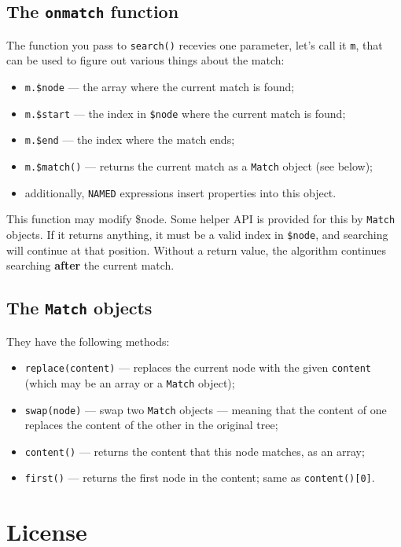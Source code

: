 \documentclass[a4paper,10pt]{article}
\begin{document}
\subsection{The \texttt{onmatch} function}
\label{sec-4-1}


The function you pass to \texttt{search()} recevies one parameter, let's call it
\texttt{m}, that can be used to figure out various things about the match:

\begin{itemize}
\item \texttt{m.\$node} — the array where the current match is found;
\item \texttt{m.\$start} — the index in \texttt{\$node} where the current match is found;
\item \texttt{m.\$end} — the index where the match ends;
\item \texttt{m.\$match()} — returns the current match as a \texttt{Match} object (see below);
\item additionally, \texttt{NAMED} expressions insert properties into this object.
\end{itemize}

This function may modify \$node.  Some helper API is provided for this by
\texttt{Match} objects.  If it returns anything, it must be a valid index in
\texttt{\$node}, and searching will continue at that position.  Without a return
value, the algorithm continues searching \textbf{after} the current match.
\subsection{The \texttt{Match} objects}
\label{sec-4-2}


They have the following methods:

\begin{itemize}
\item \texttt{replace(content)} — replaces the current node with the given \texttt{content}
  (which may be an array or a \texttt{Match} object);
\item \texttt{swap(node)} — swap two \texttt{Match} objects — meaning that the content of one
  replaces the content of the other in the original tree;
\item \texttt{content()} — returns the content that this node matches, as an array;
\item \texttt{first()} — returns the first node in the content; same as \texttt{content()[0]}.
\end{itemize}
\section{License}
\label{sec-5}
\end{document}
